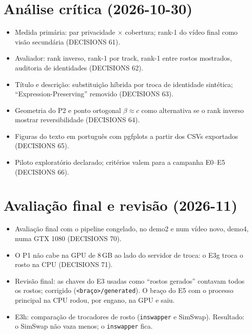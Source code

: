 \section{Análise crítica (2026-10-30)}
\begin{itemize}
\item Medida primária: par privacidade $\times$ cobertura; rank-1 do vídeo final como visão secundária (DECISIONS 61).
\item Avaliador: rank inverso, rank-1 por track, rank-1 entre rostos mostrados, auditoria de identidades (DECISIONS 62).
\item Título e descrição: substituição híbrida por troca de identidade sintética; ``Expression-Preserving'' removido (DECISIONS 63).
\item Geometria do P2 e ponto ortogonal $\beta \approx c$ como alternativa se o rank inverso mostrar reversibilidade (DECISIONS 64).
\item Figuras do texto em português com pgfplots a partir dos CSVs exportados (DECISIONS 65).
\item Piloto exploratório declarado; critérios valem para a campanha E0--E5 (DECISIONS 66).
\end{itemize}

\section{Avaliação final e revisão (2026-11)}
\begin{itemize}
\item Avaliação final com o pipeline congelado, no demo2 e num vídeo novo, demo4, numa GTX 1080 (DECISIONS 70).
\item O P1 não cabe na GPU de 8\,GB ao lado do servidor de troca: o E3g troca o rosto na CPU (DECISIONS 71).
\item Revisão final: as chaves do E3 usadas como ``rostos gerados'' contavam todos os rostos; corrigido (\texttt{<braço>/generated}). O braço do E5 com o processo principal na CPU rodou, por engano, na GPU e saiu.
\item E3h: comparação de trocadores de rosto (\texttt{inswapper} e SimSwap). Resultado: o SimSwap não vaza menos; o \texttt{inswapper} fica.
\end{itemize}

